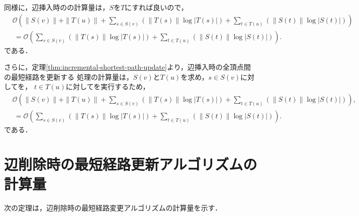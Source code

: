 同様に，辺挿入時のの計算量は，$S$を$T$にすれば良いので，
\begin{equation*}
  \begin{aligned}
    &\mathcal{O}(\|S(v)\|+\|T(u)\|+\sum_{s\in S(v)}(\|T(s)\|\log|T(s)|)+\sum_{t\in T(u)}(\|S(t)\|\log|S(t)|))\\
    &\:=\mathcal{O}(\sum_{s\in S(v)}(\|T(s)\|\log|T(s)|)+\sum_{t\in T(u)}(\|S(t)\|\log|S(t)|)).
  \end{aligned}
\end{equation*}
である．

さらに，定理\ref{thm:incremental-shortest-path-update}より，辺挿入時の全頂点間の最短経路を更新する
処理の計算量は，$S(v)$と$T(u)$を求め，$s\in S(v)$に対してを，
$t\in T(u)$に対してを実行するため，
\begin{align}
  &\mathcal{O}(\|S(v)\|+\|T(u)\|+\sum_{s\in S(v)}(\|T(s)\|\log|T(s)|)+\sum_{t\in T(u)}(\|S(t)\|\log|S(t)|)), \label{eq:full-incremental-shortest-path-update-weighted} \\
  &\:=\mathcal{O}(\sum_{s\in S(v)}(\|T(s)\|\log|T(s)|)+\sum_{t\in T(u)}(\|S(t)\|\log|S(t)|)). \label{eq:full-incremental-shortest-path-update-unweighted}
\end{align}
である．

\section{辺削除時の最短経路更新アルゴリズムの計算量}
次の定理は，辺削除時の最短経路変更アルゴリズムの計算量を示す．

